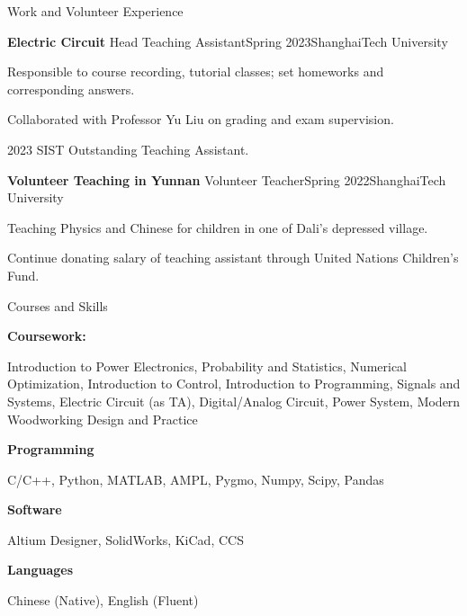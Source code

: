 \documentclass[]{ZhongtaoGuan-CV}
\begin{document}
\newpage

\begin{section}{Work and Volunteer Experience}
 \begin{subsection}{\textbf{Electric Circuit}}
     {Head Teaching Assistant}{Spring 2023}{ShanghaiTech University}
     \item{Responsible to course recording, tutorial classes; set homeworks and corresponding answers.}
     \item {Collaborated with Professor Yu Liu on grading and exam supervision.}
     \item{2023 SIST Outstanding Teaching Assistant.}
 \end{subsection}
 \begin{subsection}{\textbf{Volunteer Teaching in Yunnan}}
     {Volunteer Teacher}{Spring 2022}{ShanghaiTech University}
     \item{Teaching Physics and Chinese for children in one of Dali's depressed village.}
     \item{Continue donating salary of teaching assistant through United Nations Children's Fund.}
 \end{subsection}
\end{section}

\begin{section}{Courses and Skills}

\begin{subsectionnobullet}{\textbf{Coursework:}}{}{}{}
 \item {Introduction to Power Electronics, Probability and Statistics, Numerical Optimization, Introduction to Control, Introduction to Programming,
Signals and Systems, Electric Circuit (as TA), Digital/Analog Circuit, Power System, Modern Woodworking Design and Practice}
\end{subsectionnobullet}
\begin{subsectionnobullet}{\textbf{Programming}}{}{}{}
    \item {C/C++, Python, MATLAB, AMPL, Pygmo, Numpy, Scipy, Pandas}
\end{subsectionnobullet}
\begin{subsectionnobullet}{\textbf{Software}}{}{}{}
    \item {Altium Designer, SolidWorks, KiCad, CCS}
\end{subsectionnobullet}
\begin{subsectionnobullet}{\textbf{Languages}}{}{}{}
    \item {Chinese (Native), English (Fluent)}
\end{subsectionnobullet}
\end{section}
\end{document}
